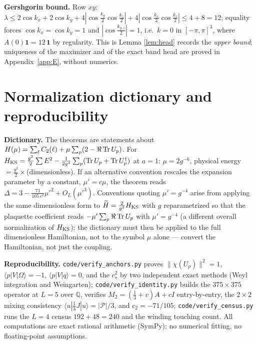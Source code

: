 \textbf{Gershgorin bound.} Row $xy$:
$\lambda\le 2\cos k_x+2\cos k_y+4|\cos\tfrac{k_y}{2}\cos\tfrac{k_z}{2}|
+4|\cos\tfrac{k_x}{2}\cos\tfrac{k_z}{2}|\le 4+8=12$; equality forces
$\cos k_x=\cos k_y=1$ and $|\cos\tfrac{k_{y,z}}{2}|=1$, i.e.\ $k=0$ in
$[-\pi,\pi]^3$, where $A(0)\mathbf 1=12\,\mathbf 1$ by regularity. This is
Lemma \ref{lem:head} records the \emph{upper bound}; uniqueness of the
maximizer and of the exact band head are proved in Appendix~\ref{app:E},
without numerics.

\section{Normalization dictionary and reproducibility}\label{app:D}
\textbf{Dictionary.} The theorems are statements about
$H(\mu)=\sum_\ell C_2(\ell)+\mu\sum_p(2-\Re\operatorname{Tr} U_p)$.
For $H_{\rm KS}=\frac{g^2}{2}\sum E^2-\frac{1}{2g^4}\sum_p(\operatorname{Tr} U_p+\operatorname{Tr}
U_p^\dagger)$ at $a=1$: $\mu=2g^{-6}$, physical energy
$=\frac{g^2}{2}\times$(dimensionless). If an alternative convention
rescales the expansion parameter by a constant, $\mu'=c\mu$, the theorem
reads $\Delta=3-\frac{71}{105\,c^{2}}\mu'^{2}+O_L(\mu'^{3})$. Conventions
quoting $\mu'=g^{-4}$ arise from applying the same dimensionless form to
$\widetilde H=\frac{2}{g^2}H_{\rm KS}$ with $g$ reparametrized so that the
plaquette coefficient reads $-\mu'\sum_p\Re\operatorname{Tr} U_p$ with $\mu'=g^{-4}$
(a different overall normalization of $H_{\rm KS}$); the dictionary must then be
applied to the full dimensionless Hamiltonian, not to the symbol $\mu$
alone --- convert the Hamiltonian, not just the coupling.

\textbf{Reproducibility.} \texttt{code/verify\_anchors.py} proves
$\|\chi(U_p)\|^2=1$, $\langle p|V|\Omega\rangle=-1$,
$\langle p|V|q\rangle=0$, and the $c_s^2$ by two independent exact methods
(Weyl integration and Weingarten); \texttt{code/verify\_identity.py}
builds the $375\times375$ operator at $L=5$ over $\mathbb Q$, verifies
$M_2=(\tfrac13+v)A+cI$ entry-by-entry, the $2\times2$ mixing consistency
$\langle u|\tfrac13J|u\rangle=|\mathcal P|/3$, and $c_2=-71/105$;
\texttt{code/verify\_census.py} runs the $L=4$ census
$192+48=240$ and the winding touching count. All computations are exact
rational arithmetic (SymPy); no numerical fitting, no floating-point
assumptions.

